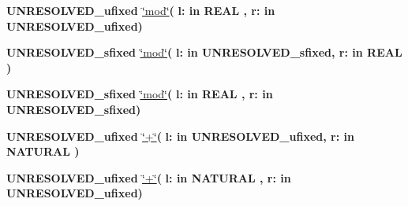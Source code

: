 \begin{DoxyCompactItemize}
\item 
{\bfseries {\bfseries \textcolor{vhdlchar}{U\+N\+R\+E\+S\+O\+L\+V\+E\+D\+\_\+ufixed}\textcolor{vhdlchar}{ }}} \hyperlink{class__fixed__pkg_adcb31bd19e000188752c17ad006b956d}{\char`\"{}mod\char`\"{}}{\bfseries  ( }{\bfseries \textcolor{vhdlchar}{l\+: }\textcolor{stringliteral}{in }{\bfseries \textcolor{comment}{R\+E\+A\+L}\textcolor{vhdlchar}{ }}}{\bfseries  , \textcolor{vhdlchar}{r\+: }\textcolor{stringliteral}{in }\textcolor{vhdlchar}{U\+N\+R\+E\+S\+O\+L\+V\+E\+D\+\_\+ufixed}}{\bfseries  )} 
\item 
{\bfseries {\bfseries \textcolor{vhdlchar}{U\+N\+R\+E\+S\+O\+L\+V\+E\+D\+\_\+sfixed}\textcolor{vhdlchar}{ }}} \hyperlink{class__fixed__pkg_a3ef5d5f2634d904601d29ae5c41d2f9e}{\char`\"{}mod\char`\"{}}{\bfseries  ( }{\bfseries \textcolor{vhdlchar}{l\+: }\textcolor{stringliteral}{in }\textcolor{vhdlchar}{U\+N\+R\+E\+S\+O\+L\+V\+E\+D\+\_\+sfixed}}{\bfseries  , \textcolor{vhdlchar}{r\+: }\textcolor{stringliteral}{in }{\bfseries \textcolor{comment}{R\+E\+A\+L}\textcolor{vhdlchar}{ }}}{\bfseries  )} 
\item 
{\bfseries {\bfseries \textcolor{vhdlchar}{U\+N\+R\+E\+S\+O\+L\+V\+E\+D\+\_\+sfixed}\textcolor{vhdlchar}{ }}} \hyperlink{class__fixed__pkg_a3ef5d5f2634d904601d29ae5c41d2f9e}{\char`\"{}mod\char`\"{}}{\bfseries  ( }{\bfseries \textcolor{vhdlchar}{l\+: }\textcolor{stringliteral}{in }{\bfseries \textcolor{comment}{R\+E\+A\+L}\textcolor{vhdlchar}{ }}}{\bfseries  , \textcolor{vhdlchar}{r\+: }\textcolor{stringliteral}{in }\textcolor{vhdlchar}{U\+N\+R\+E\+S\+O\+L\+V\+E\+D\+\_\+sfixed}}{\bfseries  )} 
\item 
{\bfseries {\bfseries \textcolor{vhdlchar}{U\+N\+R\+E\+S\+O\+L\+V\+E\+D\+\_\+ufixed}\textcolor{vhdlchar}{ }}} \hyperlink{class__fixed__pkg_aa622ccc4cb69ba73b8e7f9a8cfe42788}{\char`\"{}+\char`\"{}}{\bfseries  ( }{\bfseries \textcolor{vhdlchar}{l\+: }\textcolor{stringliteral}{in }\textcolor{vhdlchar}{U\+N\+R\+E\+S\+O\+L\+V\+E\+D\+\_\+ufixed}}{\bfseries  , \textcolor{vhdlchar}{r\+: }\textcolor{stringliteral}{in }{\bfseries \textcolor{comment}{N\+A\+T\+U\+R\+A\+L}\textcolor{vhdlchar}{ }}}{\bfseries  )} 
\item 
{\bfseries {\bfseries \textcolor{vhdlchar}{U\+N\+R\+E\+S\+O\+L\+V\+E\+D\+\_\+ufixed}\textcolor{vhdlchar}{ }}} \hyperlink{class__fixed__pkg_aa622ccc4cb69ba73b8e7f9a8cfe42788}{\char`\"{}+\char`\"{}}{\bfseries  ( }{\bfseries \textcolor{vhdlchar}{l\+: }\textcolor{stringliteral}{in }{\bfseries \textcolor{comment}{N\+A\+T\+U\+R\+A\+L}\textcolor{vhdlchar}{ }}}{\bfseries  , \textcolor{vhdlchar}{r\+: }\textcolor{stringliteral}{in }\textcolor{vhdlchar}{U\+N\+R\+E\+S\+O\+L\+V\+E\+D\+\_\+ufixed}}{\bfseries  )} 

\end{DoxyCompactItemize}
